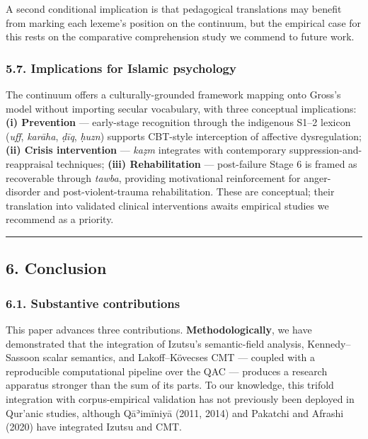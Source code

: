 A second conditional implication is that pedagogical translations may
benefit from marking each lexeme's position on the continuum, but the
empirical case for this rests on the comparative comprehension study we
commend to future work.

\subsubsection{5.7. Implications for Islamic
psychology}\label{implications-for-islamic-psychology}

The continuum offers a culturally-grounded framework mapping onto
Gross's model without importing secular vocabulary, with three
conceptual implications: \textbf{(i) Prevention} --- early-stage
recognition through the indigenous S1--2 lexicon (\emph{uff},
\emph{karāha}, \emph{ḍīq}, \emph{ḥuzn}) supports CBT-style interception
of affective dysregulation; \textbf{(ii) Crisis intervention} ---
\emph{kaẓm} integrates with contemporary suppression-and-reappraisal
techniques; \textbf{(iii) Rehabilitation} --- post-failure Stage 6 is
framed as recoverable through \emph{tawba}, providing motivational
reinforcement for anger-disorder and post-violent-trauma rehabilitation.
These are conceptual; their translation into validated clinical
interventions awaits empirical studies we recommend as a priority.

\begin{center}\rule{0.5\linewidth}{0.5pt}\end{center}

\subsection{6. Conclusion}\label{conclusion}

\subsubsection{6.1. Substantive
contributions}\label{substantive-contributions}

This paper advances three contributions. \textbf{Methodologically}, we
have demonstrated that the integration of Izutsu's semantic-field
analysis, Kennedy--Sassoon scalar semantics, and Lakoff--Kövecses CMT
--- coupled with a reproducible computational pipeline over the QAC ---
produces a research apparatus stronger than the sum of its parts. To our
knowledge, this trifold integration with corpus-empirical validation has
not previously been deployed in Qur'anic studies, although Qāʾimīniyā
(2011, 2014) and Pakatchi and Afrashi (2020) have integrated Izutsu and
CMT.

